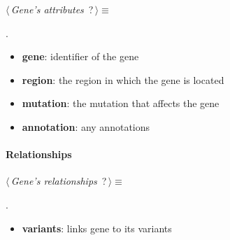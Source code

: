 	\begin{flushleft} \small
\begin{minipage}{\linewidth}\label{scrap6}\raggedright\small
{} $\langle\,${\itshape {Gene's attributes}}\nobreak\ {\footnotesize {?}}$\,\rangle\equiv$
\vspace{-1ex}
\begin{list}{}{} \item

                
        {\NWsep}
\end{list}
\vspace{-1.5ex}
\footnotesize
\begin{list}{}{\setlength{\itemsep}{-\parsep}\setlength{\itemindent}{-\leftmargin}}
\item {\NWtxtMacroNoRef}.

\item{}
\end{list}
\end{minipage}\vspace{4ex}
\end{flushleft}
\begin{itemize}
 	\item \textbf{gene}: identifier of the gene
 	\item \textbf{region}: the region in which the gene is located
 	\item \textbf{mutation}: the mutation that affects the gene
 	\item \textbf{annotation}: any annotations
\end{itemize}

\paragraph{Relationships} 

	\begin{flushleft} \small
\begin{minipage}{\linewidth}\label{scrap7}\raggedright\small
{} $\langle\,${\itshape {Gene's relationships}}\nobreak\ {\footnotesize {?}}$\,\rangle\equiv$
\vspace{-1ex}
\begin{list}{}{} \item

                
        {\NWsep}
\end{list}
\vspace{-1.5ex}
\footnotesize
\begin{list}{}{\setlength{\itemsep}{-\parsep}\setlength{\itemindent}{-\leftmargin}}
\item {\NWtxtMacroNoRef}.

\item{}
\end{list}
\end{minipage}\vspace{4ex}
\end{flushleft}
\begin{itemize}
 	\item \textbf{variants}: links gene to its variants
\end{itemize}



